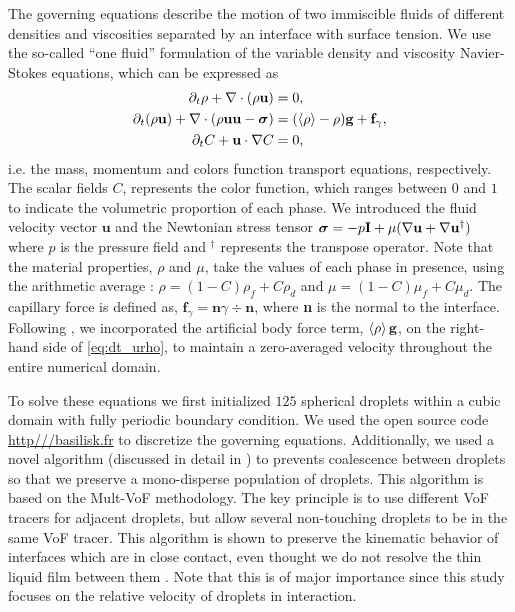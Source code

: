 The governing equations describe the motion of two immiscible fluids of different densities and viscosities separated by an interface with surface tension. 
We use the so-called ``one fluid'' formulation of the variable density and viscosity Navier-Stokes equations, which can be expressed as 
\begin{align}
    \pddt \rho+ \div(\rho\textbf{u})
    &= 0,\\
    \label{eq:dt_urho}
    \pddt (\rho \textbf{u})
    + \div (\rho  \textbf{u} \textbf{u} - \bm\sigma)
    &= (\avg{\rho} - \rho)\textbf{g}
    + \textbf{f}_\gamma,\\
    \label{eq:dt_C}
    \pddt C + \textbf{u}\cdot\grad C  
    &= 0,
\end{align}
i.e. the mass, momentum and colors function transport equations, respectively. 
The scalar fields $C$, represents the color function, which ranges between $0$ and $1$ to indicate the volumetric proportion of each phase.
We introduced the fluid velocity vector $\textbf{u}$ and the Newtonian stress tensor $\bm{\sigma} = -p \textbf{I} + \mu (\mathbf{\nabla} \textbf{u}+ \mathbf{\nabla} \textbf{u}^\dagger)$ where $p$ is the pressure field and $^\dagger$ represents the transpose operator.
Note that the material properties, $\rho$ and $\mu$, take the values of each phase in presence, using the arithmetic average : $\rho = (1-C)\rho_f + C \rho_d$ and $\mu = (1-C)\mu_f + C \mu_d$. 
The capillary force is defined as, $\textbf{f}_\gamma =\textbf{n} \gamma \div \textbf{n} $, where \textbf{n} is the normal to the interface.
Following  \citep{bunner2002dynamics}, we incorporated the artificial body force term, $\left<\rho\right>\textbf{g}$, on the right-hand side of \ref{eq:dt_urho}, to maintain a zero-averaged velocity throughout the entire numerical domain.  

To solve these equations we first initialized $125$ spherical droplets within a cubic domain with fully periodic boundary condition. 
We used the open source code \url{http///basilisk.fr} to discretize the governing equations. 
Additionally, we used a novel algorithm (discussed in detail in \citep{mani2021numerical,fintzi2024buoyancy}) to prevents coalescence between droplets so that we preserve a mono-disperse population of droplets. 
This algorithm is based on the Mult-VoF methodology. 
The key principle is to use different VoF tracers for adjacent droplets, but allow several non-touching droplets to be in the same VoF tracer.
This algorithm is shown to preserve the kinematic behavior of interfaces which are in close contact, even thought we do not resolve the thin liquid film between them \citep{fintzi2024buoyancy}. 
Note that this is of major importance since this study focuses on the relative velocity of droplets in interaction. 

